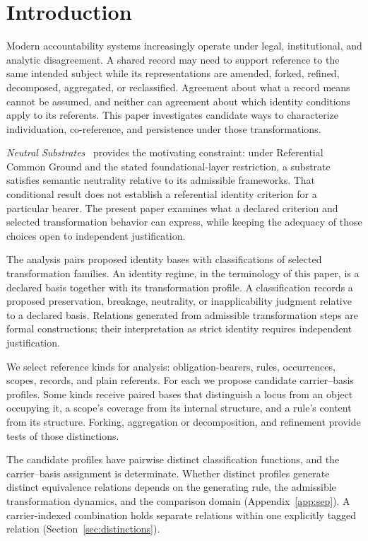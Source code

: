
\section{Introduction}
\label{sec:intro}

Modern accountability systems increasingly operate under legal,
institutional, and analytic disagreement.
A shared record may need to
support reference to the same intended subject while its representations
are amended, forked, refined, decomposed, aggregated, or reclassified.
Agreement about what a record means cannot be assumed, and neither can
agreement about which identity conditions apply to its referents.
This paper investigates candidate ways to characterize individuation,
co-reference, and persistence under those transformations.

\emph{Neutral Substrates}~\citep{case2026neutral} provides the motivating
constraint: under Referential Common Ground and the stated foundational-layer
restriction, a substrate satisfies semantic neutrality relative to its
admissible frameworks.
That conditional result does not establish a
referential identity criterion for a particular bearer.
The present paper
examines what a declared criterion and selected transformation behavior
can express, while keeping the adequacy of those choices open to
independent justification.

The analysis pairs proposed identity bases with classifications of selected
transformation families.
An identity regime, in the terminology of this
paper, is a declared basis together with its transformation profile.
A classification records a proposed preservation, breakage, neutrality,
or inapplicability judgment relative to a declared basis.
Relations generated from admissible transformation steps are formal
constructions; their interpretation as strict identity requires
independent justification.

We select reference kinds for analysis: obligation-bearers, rules,
occurrences, scopes, records, and plain referents.
For each we propose candidate carrier--basis profiles.
Some kinds receive paired bases that distinguish a locus
from an object occupying it, a scope's coverage from its internal
structure, and a rule's content from its structure.
Forking, aggregation or decomposition, and refinement provide
tests of those distinctions.

The candidate profiles have pairwise distinct classification
functions, and the carrier--basis assignment is determinate.
Whether distinct profiles generate distinct equivalence relations
depends on the generating rule, the admissible transformation
dynamics, and the comparison domain (Appendix~\ref{app:sep}).
A carrier-indexed combination holds separate relations within one
explicitly tagged relation (Section~\ref{sec:distinctions}).

